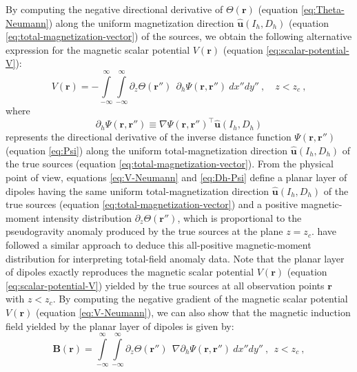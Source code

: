By computing the negative directional derivative of $\Theta(\mathbf{r})$ 
(equation \ref{eq:Theta-Neumann}) along the uniform magnetization direction
$\hat{\mathbf{u}}(I_{h}, D_{h})$ (equation \ref{eq:total-magnetization-vector}) 
of the sources, we obtain the following alternative expression for the magnetic 
scalar potential $V(\mathbf{r})$ (equation \ref{eq:scalar-potential-V}):
\begin{equation}
V(\mathbf{r}) = -
\int\limits_{-\infty}^{\infty} \int\limits_{-\infty}^{\infty}
\partial_{z} \Theta(\mathbf{r}'') \:\:
\partial_{h} \Psi(\mathbf{r}, \mathbf{r}'') \: dx''dy'' \: , \quad z < z_{c} \: ,
\label{eq:V-Neumann}
\end{equation}
where
\begin{equation}
\partial_{h} \Psi(\mathbf{r}, \mathbf{r}'') \equiv 
\nabla \Psi(\mathbf{r}, \mathbf{r}'')^{\top}
\hat{\mathbf{u}}(I_{h}, D_{h})
\label{eq:Dh-Psi}
\end{equation}
represents the directional derivative of the inverse distance function 
$\Psi(\mathbf{r}, \mathbf{r}'')$ (equation \ref{eq:Psi}) along the uniform
total-magnetization direction $\hat{\mathbf{u}}(I_{h}, D_{h})$ of the true sources
(equation \ref{eq:total-magnetization-vector}).
From the physical point of view, equations \ref{eq:V-Neumann} and \ref{eq:Dh-Psi} 
define a planar layer of dipoles having the same uniform total-magnetization direction 
$\hat{\mathbf{u}}(I_{h}, D_{h})$ of the true sources (equation \ref{eq:total-magnetization-vector}) 
and a positive magnetic-moment intensity distribution 
$\partial_{z} \Theta(\mathbf{r}'')$, which is proportional to the 
pseudogravity anomaly produced by the true sources at the plane $z = z_{c}$. 
\citet{reis_etal2020} have followed a similar approach to deduce this 
all-positive magnetic-moment distribution for interpreting 
total-field anomaly data.
Note that the planar layer of dipoles exactly reproduces the magnetic scalar potential
$V(\mathbf{r})$ (equation \ref{eq:scalar-potential-V}) yielded by the true sources at 
all observation points $\mathbf{r}$ with $z < z_{c}$. 
By computing the negative gradient of the magnetic scalar potential $V(\mathbf{r})$ 
(equation \ref{eq:V-Neumann}), we can also show that the 
magnetic induction field yielded by the planar layer of dipoles 
is given by:
\begin{equation}
\mathbf{B}(\mathbf{r}) =
\int\limits_{-\infty}^{\infty} \int\limits_{-\infty}^{\infty}
\partial_{z} \Theta(\mathbf{r}'') \:\: 
\nabla \partial_{h} \Psi(\mathbf{r}, \mathbf{r}'') \: dx''dy'' \: , \:\: z < z_{c} \: ,
\label{eq:B-field-Neumann}
\end{equation}

